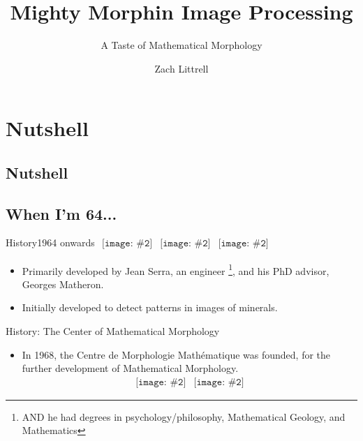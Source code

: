 \documentclass{beamer}
\title[A Taste of Mathematical Morphology]
      {Mighty Morphin Image Processing}
\subtitle{A Taste of Mathematical Morphology}
\author{Zach Littrell}
\institute{McDaniel College}
\newcommand{\pic}[2]{
     \begin{array}{l}
      \texttt{[image: \#2]}
      \end{array}
}
\begin{document}
\begin{frame}
  \titlepage
\end{frame}
\section{Nutshell}
\subsection{Nutshell}

\subsection{When I'm 64...}
\begin{frame}{History}{1964 onwards}
$\pic{width=100pt}{./images/matheron.jpg}
\pic{width=75pt}{./images/serra.jpg}
\pic{width=100pt}{images/petrograph.png}
$

\begin{itemize} 
  \item Primarily developed by Jean Serra, an engineer
        \footnote{AND he had degrees in psychology/philosophy,
                  Mathematical Geology, and Mathematics},
        and his PhD advisor, Georges Matheron.
  \item Initially developed to detect patterns in images of minerals.
\end{itemize}
\end{frame}

\begin{frame}{History: The Center of Mathematical Morphology}
  \begin{itemize}
    \item In 1968, the Centre de Morphologie Math\'{e}matique 
          was founded, for the further development of Mathematical Morphology.
          $$\pic{width=100pt}{images/cmm.png}
            \pic{width=100pt}{images/directions.png}$$
  \end{itemize}
\end{frame}
\end{document}
